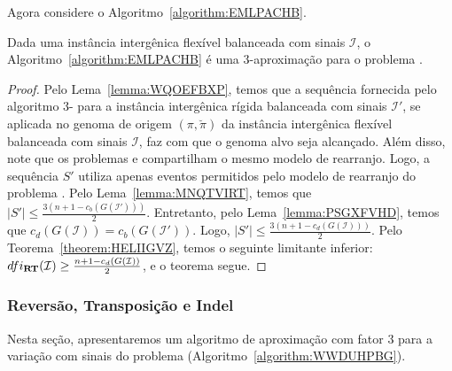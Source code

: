 Agora considere o Algoritmo~\ref{algorithm:EMLPACHB}.



\begin{theorem}\label{theorem:QISZKAHW}
Dada uma instância intergênica flexível balanceada com sinais $\mathcal{I}$, o Algoritmo~\ref{algorithm:EMLPACHB} é uma $3$-aproximação para o problema \SbFIRT{}.
\end{theorem}
\begin{proof}
Pelo Lema~\ref{lemma:WQOEFBXP}, temos que a sequência fornecida pelo algoritmo $3$-\SbIRT{} para a instância intergênica rígida balanceada com sinais $\mathcal{I'}$, se aplicada no genoma de origem $(\pi,\breve\pi)$ da instância intergênica flexível balanceada com sinais $\mathcal{I}$, faz com que o genoma alvo seja alcançado. Além disso, note que os problemas \SbIRT{} e \SbFIRT{} compartilham o mesmo modelo de rearranjo. Logo, a sequência $S'$ utiliza apenas eventos permitidos pelo modelo de rearranjo do problema \SbFIRT{}. Pelo Lema~\ref{lemma:MNQTVIRT}, temos que $|S'| \le \frac{3({n+1} - c_b(G(\mathcal{I}')))}{2}$. Entretanto, pelo Lema~\ref{lemma:PSGXFVHD}, temos que $c_d(G(\mathcal{I})) = c_b(G(\mathcal{I}'))$. Logo, $|S'| \le \frac{3({n+1} - c_d(G(\mathcal{I})))}{2}$. Pelo Teorema~\ref{theorem:HELIIGVZ}, temos o seguinte limitante inferior: $dfi_{\textbf{RT}}(\mathcal{I}) \ge \frac{{n+1} - c_d(G(\mathcal{I}))}{2}$, e o teorema segue.
\end{proof}

\subsubsection{Reversão, Transposição e Indel}

Nesta seção, apresentaremos um algoritmo de aproximação com fator $3$ para a variação com sinais do problema \SbFIRTI{} (Algoritmo~\ref{algorithm:WWDUHPBG}).



